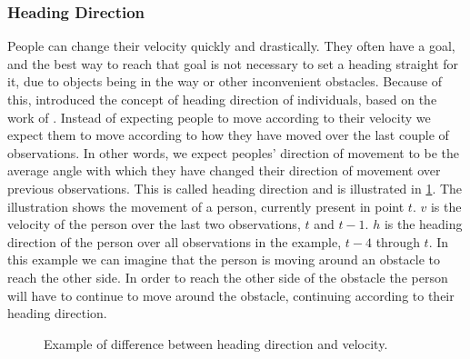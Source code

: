 \subsubsection{Heading Direction}\label{subsubsec:headingDirection}
People can change their velocity quickly and drastically. They often have a goal, and the best way to reach that goal is not necessary to set a heading straight for it, due to objects being in the way or other inconvenient obstacles. Because of this, \citet{wirz2012inferring} introduced the concept of heading direction of individuals, based on the work of \citet{localTrendStatistics}. Instead of expecting people to move according to their velocity we expect them to move according to how they have moved over the last couple of observations. In other words, we expect peoples' direction of movement to be the average angle with which they have changed their direction of movement over previous observations. This is called heading direction and is illustrated in \cref{fig:headingvsvelocity}. The illustration shows the movement of a person, currently present in point $t$. $v$ is the velocity of the person over the last two observations, $t$ and $t-1$. $h$ is the heading direction of the person over all observations in the example, $t-4$ through $t$. In this example we can imagine that the person is moving around an obstacle to reach the other side. In order to reach the other side of the obstacle the person will have to continue to move around the obstacle, continuing according to their heading direction.

\begin{figure}[htbp]
\centering
{}
\caption{Example of difference between heading direction and velocity.}
\label{fig:headingvsvelocity}
\end{figure}

